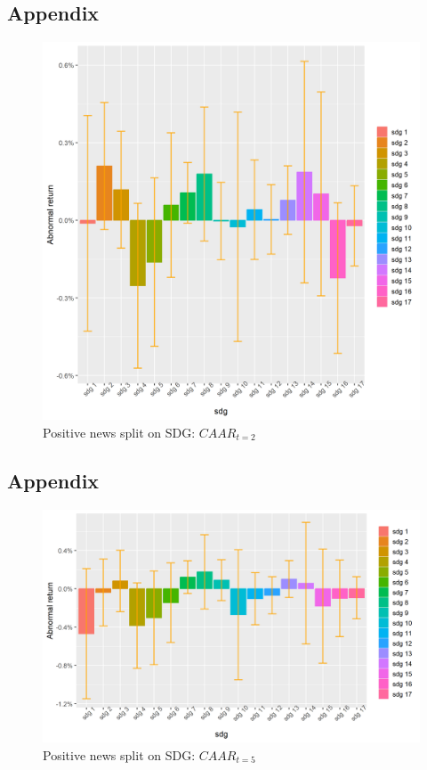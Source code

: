 
\subsection{Appendix} \label{app: derivations}
\begin{figure} [H] 
    \centering
    \includegraphics[scale=0.6]{Projekt/1.Figures analysis/ST_positive_sdg_bar_2.png} 
    \caption{Positive news split on SDG: $CAAR_{t=2}$}
    \label{fig:ST_pos_news}
\end{figure}

\subsection{Appendix} \label{app: derivations}
\begin{figure} [H] 
    \centering
    \includegraphics[scale=0.6]{Projekt/1.Figures analysis/ST_positive_sdg_bar_5.png} 
    \caption{Positive news split on SDG: $CAAR_{t=5}$}
    \label{fig:ST_pos_news}
\end{figure}

